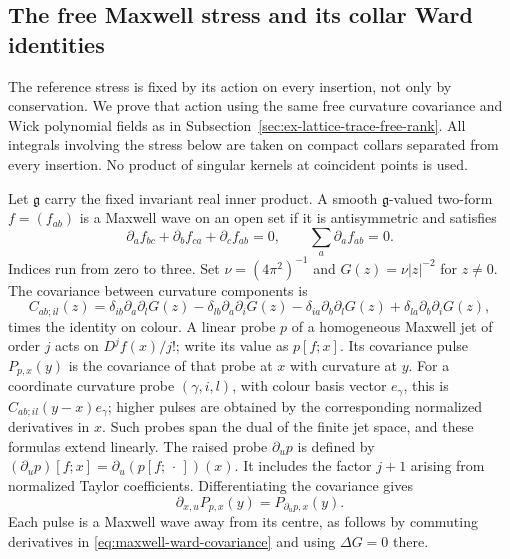 \subsection{The free Maxwell stress and its collar Ward identities}
\label{sec:free-maxwell-ward-flux}

The reference stress is fixed by its action on every insertion, not only
by conservation. We prove that action using the same free curvature
covariance and Wick polynomial fields as in
Subsection~\ref{sec:ex-lattice-trace-free-rank}. All integrals involving
the stress below are taken on compact collars separated from every
insertion. No product of singular kernels at coincident points is used.

Let $\mathfrak g$ carry the fixed invariant real inner product. A smooth
$\mathfrak g$-valued two-form $f=(f_{ab})$ is a Maxwell wave on an
open set if it is antisymmetric and satisfies
\[
 \partial_af_{bc}+\partial_bf_{ca}+\partial_cf_{ab}=0,
 \qquad \sum_a\partial_af_{ab}=0.
\]
Indices run from zero to three. Set $\nu=(4\pi^2)^{-1}$ and
$G(z)=\nu|z|^{-2}$ for $z\ne0$. The covariance between curvature
components is
\begin{equation}\label{eq:maxwell-ward-covariance}
 C_{ab;il}(z)=\delta_{ib}\partial_a\partial_lG(z)
 -\delta_{lb}\partial_a\partial_iG(z)
 -\delta_{ia}\partial_b\partial_lG(z)
 +\delta_{la}\partial_b\partial_iG(z),
\end{equation}
times the identity on colour. A linear probe $p$ of a homogeneous
Maxwell jet of order $j$ acts on $D^jf(x)/j!$; write its value as
$p[f;x]$. Its covariance pulse $P_{p,x}(y)$ is the covariance of that
probe at $x$ with curvature at $y$. For a coordinate curvature probe
$(\gamma,i,l)$, with colour basis vector $e_\gamma$, this is $C_{ab;il}(y-x)e_\gamma$; higher pulses are obtained by
the corresponding normalized derivatives in $x$. Such probes span the
dual of the finite jet space, and these formulas extend linearly.
The raised probe $\partial_u p$ is defined by
$(\partial_up)[f;x]=\partial_u(p[f;\,\cdot\,])(x)$.
It includes the factor $j+1$ arising from normalized Taylor coefficients.
Differentiating the covariance gives
\begin{equation}\label{eq:maxwell-pulse-differentiation}
 \partial_{x,u}P_{p,x}(y)=P_{\partial_up,x}(y).
\end{equation}
Each pulse is a Maxwell wave away from its centre, as follows by
commuting derivatives in \eqref{eq:maxwell-ward-covariance} and using
$\Delta G=0$ there.

